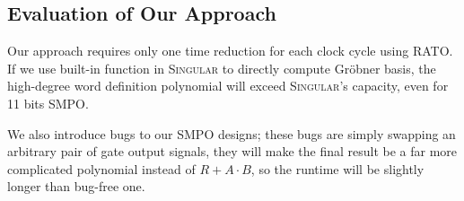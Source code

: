 \subsection{Evaluation of Our Approach}
Our approach requires only one time reduction for each clock cycle using RATO. If we use built-in function in \textsc{Singular} to directly
compute Gr\"obner basis, the high-degree word definition polynomial will exceed \textsc{Singular}'s capacity, even for 11 bits SMPO.

We also introduce bugs to our SMPO designs; these bugs are simply swapping an arbitrary pair of gate output signals, they will make the final result be
a far more complicated polynomial instead of $R+A\cdot B$, so the runtime will be slightly longer than bug-free one.